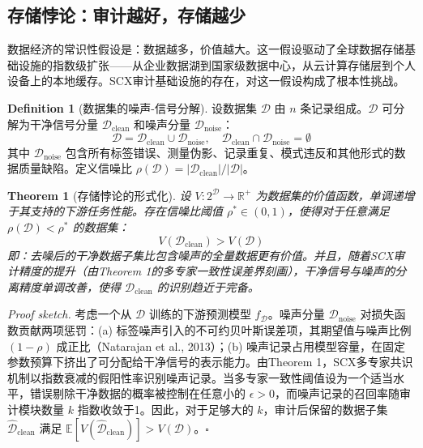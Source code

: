 \documentclass[12pt,a4paper]{ctexart}
\newtheorem{theorem}{Theorem}[section]
\theoremstyle{definition}
\newtheorem{definition}{Definition}[section]
\theoremstyle{remark}
\begin{document}
\subsection{存储悖论：审计越好，存储越少}

数据经济的常识性假设是：数据越多，价值越大。这一假设驱动了全球数据存储基础设施的指数级扩张——从企业数据湖到国家级数据中心，从云计算存储层到个人设备上的本地缓存。SCX审计基础设施的存在，对这一假设构成了根本性挑战。

\begin{definition}[数据集的噪声-信号分解]
设数据集 $\mathcal{D}$ 由 $n$ 条记录组成。$\mathcal{D}$ 可分解为干净信号分量 $\mathcal{D}_{\text{clean}}$ 和噪声分量 $\mathcal{D}_{\text{noise}}$：
\begin{equation}
\mathcal{D} = \mathcal{D}_{\text{clean}} \cup \mathcal{D}_{\text{noise}}, \quad \mathcal{D}_{\text{clean}} \cap \mathcal{D}_{\text{noise}} = \emptyset
\end{equation}
其中 $\mathcal{D}_{\text{noise}}$ 包含所有标签错误、测量伪影、记录重复、模式违反和其他形式的数据质量缺陷。定义信噪比 $\rho(\mathcal{D}) = |\mathcal{D}_{\text{clean}}| / |\mathcal{D}|$。
\end{definition}

\begin{theorem}[存储悖论的形式化]
\label{thm:storage-paradox}
设 $V: 2^{\mathcal{D}} \to \mathbb{R}^+$ 为数据集的价值函数，单调递增于其支持的下游任务性能。存在信噪比阈值 $\rho^* \in (0, 1)$，使得对于任意满足 $\rho(\mathcal{D}) < \rho^*$ 的数据集：
\begin{equation}
V(\mathcal{D}_{\text{clean}}) > V(\mathcal{D})
\end{equation}
即：去噪后的干净数据子集比包含噪声的全量数据更有价值。并且，随着SCX审计精度的提升（由Theorem 1的多专家一致性误差界刻画），干净信号与噪声的分离精度单调改善，使得 $\mathcal{D}_{\text{clean}}$ 的识别趋近于完备。
\end{theorem}

\textit{Proof sketch.} 考虑一个从 $\mathcal{D}$ 训练的下游预测模型 $f_{\mathcal{D}}$。噪声分量 $\mathcal{D}_{\text{noise}}$ 对损失函数贡献两项惩罚：(a) 标签噪声引入的不可约贝叶斯误差项，其期望值与噪声比例 $(1-\rho)$ 成正比（Natarajan et al., 2013）；(b) 噪声记录占用模型容量，在固定参数预算下挤出了可分配给干净信号的表示能力。由Theorem 1，SCX多专家共识机制以指数衰减的假阳性率识别噪声记录。当多专家一致性阈值设为一个适当水平，错误剔除干净数据的概率被控制在任意小的 $\epsilon > 0$，而噪声记录的召回率随审计模块数量 $k$ 指数收敛于1。因此，对于足够大的 $k$，审计后保留的数据子集 $\hat{\mathcal{D}}_{\text{clean}}$ 满足 $\mathbb{E}[V(\hat{\mathcal{D}}_{\text{clean}})] > V(\mathcal{D})$。\hfill $\square$
\end{document}
